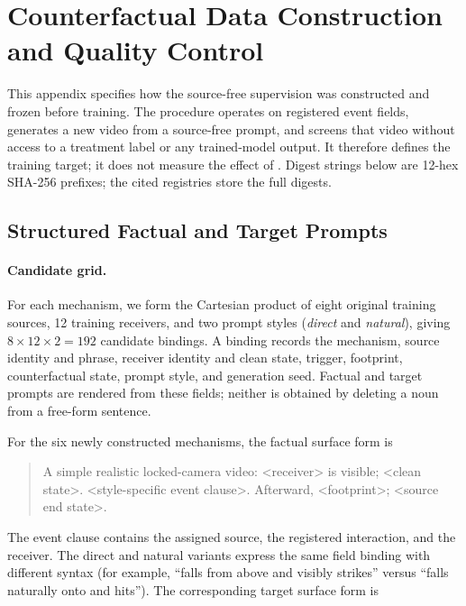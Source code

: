 \section{Counterfactual Data Construction and Quality Control}
\label{app:counterfactual-data}

This appendix specifies how the source-free supervision was constructed and
frozen before training.  The procedure operates on registered event fields,
generates a new video from a source-free prompt, and screens that video without
access to a treatment label or any trained-model output.  It therefore defines
the training target; it does not measure the effect of \methodshort.  Digest
strings below are 12-hex SHA-256 prefixes; the cited registries store the full
digests.

\subsection{Structured Factual and Target Prompts}
\label{app:structured-prompts}

\paragraph{Candidate grid.}
For each mechanism, we form the Cartesian product of eight original training
sources, 12 training receivers, and two prompt styles (\emph{direct} and
\emph{natural}), giving \(8\times12\times2=192\) candidate bindings.  A
binding records the mechanism, source identity and phrase, receiver identity
and clean state, trigger, footprint, counterfactual state, prompt style, and
generation seed.  Factual and target prompts are rendered from these fields;
neither is obtained by deleting a noun from a free-form sentence.

For the six newly constructed mechanisms, the factual surface form is

\begin{quote}\footnotesize\ttfamily\raggedright
A simple realistic locked-camera video: <receiver> is visible;
<clean state>. <style-specific event clause>. Afterward, <footprint>;
<source end state>.
\end{quote}

The event clause contains the assigned source, the registered interaction,
and the receiver.  The direct and natural variants express the same field
binding with different syntax (for example, ``falls from above and visibly
strikes'' versus ``falls naturally onto and hits'').  The corresponding target
surface form is

